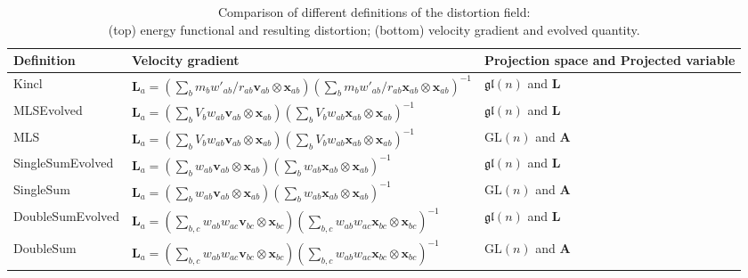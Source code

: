 \documentclass[oneside, a4paper, onecolumn, 11pt]{article}
\renewcommand{\AA}{\mathbf{A}}
\newcommand{\vv}{\mathbf{v}}
\newcommand{\xx}{\mathbf{x}}
\newcommand{\LL}{\mathbf{L}}
\newcommand{\GL}{\mathrm{GL}(n)}%
\newcommand{\gl}{\mathfrak{gl}(n)}%
\begin{document}
\begin{table}
\begin{tabular}{@{}L{3.2cm} C{9cm} C{5cm}@{}}
\toprule
\textbf{Definition} & \textbf{Velocity gradient} & \textbf{Projection space and Projected variable} \\
\midrule
Kincl &
$\LL_{a}= \left( \sum_{b} m_{b} w'_{ab}/r_{ab} \vv_{ab}\otimes \xx_{ab}\right) \left( \sum_{b} m_{b} w'_{ab}/r_{ab} \xx_{ab}\otimes \xx_{ab} \right)^{-1}$ &
$\gl$ and $\LL$ \\[6pt]
MLSEvolved &
$\LL_{a}= \left( \sum_{b} V_{b} w_{ab} \vv_{ab}\otimes \xx_{ab}\right) \left( \sum_{b} V_{b} w_{ab} \xx_{ab}\otimes \xx_{ab} \right)^{-1}$ &
$\gl$ and $\LL$ \\[6pt]
MLS &
$\LL_{a}= \left( \sum_{b} V_{b} w_{ab} \vv_{ab}\otimes \xx_{ab}\right) \left( \sum_{b} V_{b} w_{ab} \xx_{ab}\otimes \xx_{ab} \right)^{-1}$ &
$\GL$ and $\AA$ \\[6pt]
SingleSumEvolved &
$\LL_{a}= \left( \sum_{b} w_{ab} \vv_{ab}\otimes \xx_{ab}\right) \left( \sum_{b} w_{ab} \xx_{ab}\otimes \xx_{ab} \right)^{-1}$ &
$\gl$ and $\LL$ \\[6pt]
SingleSum &
$\LL_{a}= \left( \sum_{b} w_{ab} \vv_{ab}\otimes \xx_{ab}\right) \left( \sum_{b} w_{ab} \xx_{ab}\otimes \xx_{ab} \right)^{-1}$ &
$\GL$ and $\AA$ \\[6pt]
DoubleSumEvolved &
$\LL_{a}= \left( \sum_{b,c} w_{ab} w_{ac} \vv_{bc}\otimes \xx_{bc}\right) \left( \sum_{b,c} w_{ab} w_{ac} \xx_{bc}\otimes \xx_{bc} \right)^{-1}$ &
$\gl$ and $\LL$ \\[6pt]
DoubleSum &
$\LL_{a}= \left( \sum_{b,c} w_{ab} w_{ac} \vv_{bc}\otimes \xx_{bc}\right) \left( \sum_{b,c} w_{ab} w_{ac} \xx_{bc}\otimes \xx_{bc} \right)^{-1}$ &
$\GL$ and $\AA$ \\
\bottomrule
\end{tabular}

\captionsetup{justification=centering}
\caption{Comparison of different definitions of the distortion field:\\
(top) energy functional and resulting distortion;
(bottom) velocity gradient and evolved quantity.}
\end{table}
\end{document}
